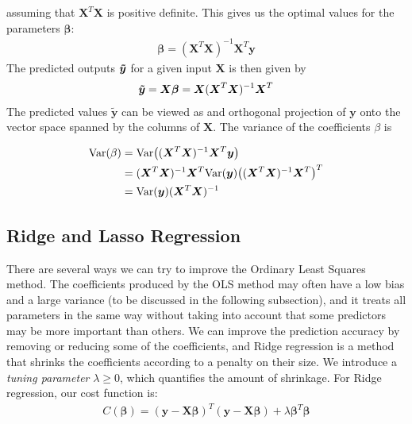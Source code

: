 assuming that $\boldsymbol{X}^T\boldsymbol{X}$ is positive definite. This gives us the optimal values for the parameters $\boldsymbol{\beta}$:
\begin{align}
    \label{eq:betaoptols}
    \boldsymbol{\beta} = ( \boldsymbol{X}^T\boldsymbol{X})^{-1} \boldsymbol{X}^T \boldsymbol{y}
\end{align}
The predicted outputs $\boldsymbol{\Tilde{y}}$ for a given input $\boldsymbol{X}$ is then given by
\begin{align}
    \boldsymbol{\Tilde{y}} = \boldsymbol{X\beta} = \boldsymbol{X}(\boldsymbol{X}^T\boldsymbol{X})^{-1}\boldsymbol{X}^T
\end{align}
The predicted values $\boldsymbol{\tilde{y}}$ can be viewed as and orthogonal projection of $\boldsymbol{y}$ onto the vector space spanned by the columns of $\boldsymbol{X}$. The variance of the coefficients $\beta$ is

\begin{align}
    \text{Var} (\beta) &= \text{Var} \big((\boldsymbol{X}^T\boldsymbol{X})^{-1} \boldsymbol{X}^T \boldsymbol{y} \big) \\
    &= (\boldsymbol{X}^T\boldsymbol{X})^{-1} \boldsymbol{X}^T \text{Var} (\boldsymbol{y}) \big((\boldsymbol{X}^T\boldsymbol{X})^{-1} \boldsymbol{X}^T\big)^T\\
    &= \text{Var}(\boldsymbol{y})(\boldsymbol{X}^T\boldsymbol{X})^{-1}
\end{align}


\subsection{Ridge and Lasso Regression}

There are several ways we can try to improve the Ordinary Least Squares method. The coefficients produced by the OLS method may often have a low bias and a large variance (to be discussed in the following subsection), and it treats all parameters in the same way without taking into account that some predictors may be more important than others. We can improve the prediction accuracy by removing or reducing some of the coefficients, and Ridge regression is a method that shrinks the coefficients according to a penalty on their size. We introduce a \textit{tuning parameter} $\lambda \geq 0$, which quantifies the amount of shrinkage. For Ridge regression, our cost function is\cite[p. 64]{hastie}:
\begin{align}
    C(\boldsymbol{\beta}) = (\boldsymbol{y} - \boldsymbol{X\beta})^T(\boldsymbol{y} - \boldsymbol{X\beta}) + \lambda \boldsymbol{\beta}^T\boldsymbol{\beta}
\end{align}

